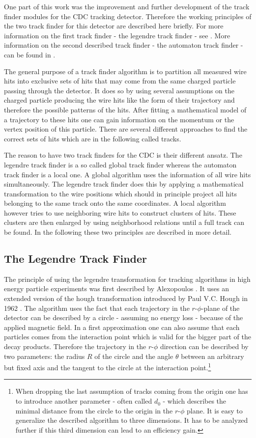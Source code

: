 One part of this work was the improvement and further development of the track finder modules for the CDC tracking detector. Therefore the working principles of the two track finder for this detector are described here briefly. For more information on the first track finder - the legendre track finder - see \cite{kronenbitter}. More information on the second described track finder - the automaton track finder - can be found in \cite{oliver}.

The general purpose of a track finder algorithm is to partition all measured wire hits into exclusive sets of hits that may come from the same charged particle passing through the detector. It does so by using several assumptions on the charged particle producing the wire hits like the form of their trajectory and therefore the possible patterns of the hits. After fitting a mathematical model of a trajectory to these hits one can gain information on the momentum or the vertex position of this particle. There are several different approaches to find the correct sets of hits which are in the following called tracks.

The reason to have two track finders for the CDC is their different ansatz. The legendre track finder is a so called global track finder whereas the automaton track finder is a local one. A global algorithm uses the information of all wire hits simultaneously. The legendre track finder does this by applying a mathematical transformation to the wire positions which should in principle project all hits belonging to the same track onto the same coordinates. A local algorithm however tries to use neighboring wire hits to construct clusters of hits. These clusters are then enlarged by using neighborhood relations until a full track can be found. In the following these two principles are described in more detail.

\subsection{The Legendre Track Finder}
The principle of using the legendre transformation for tracking algorithms in high energy particle experiments was first described by Alexopoulos \cite{legendre}. It uses an extended version of the hough transformation introduced by Paul V.C. Hough in 1962 \cite{hough}. The algorithm uses the fact that each trajectory in the $r$-$\phi$-plane of the detector can be described by a circle - assuming no energy loss - because of the applied magnetic field. In a first approximation one can also assume that each particles comes from the interaction point which is valid for the bigger part of the decay products. Therefore the trajectory in the $r$-$\phi$ direction can be described by two parameters: the radius $R$ of the circle and the angle $\theta$ between an arbitrary but fixed axis and the tangent to the circle at the interaction point.\footnote{When dropping the last assumption of tracks coming from the origin one has to introduce another parameter - often called $d_0$ - which describes the minimal distance from the circle to the origin in the $r$-$\phi$ plane. It is easy to generalize the described algorithm to three dimensions. It has to be analyzed further if this third dimension can lead to an efficiency gain.}

